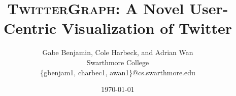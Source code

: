 \documentclass{sig-alternate}
\newcommand{\sys}{\textsc{TwitterGraph}}
\begin{document}
\date{\today}

\title{\LARGE{\sys: A Novel User-Centric Visualization of Twitter}}

\author{
    Gabe Benjamin, Cole Harbeck, and Adrian Wan\\
    Swarthmore College\\
    \{gbenjam1, charbec1, awan1\}@cs.swarthmore.edu
}

\maketitle


% 
% 
% 
% 
% 
% 
% 


\balance
\end{document}
